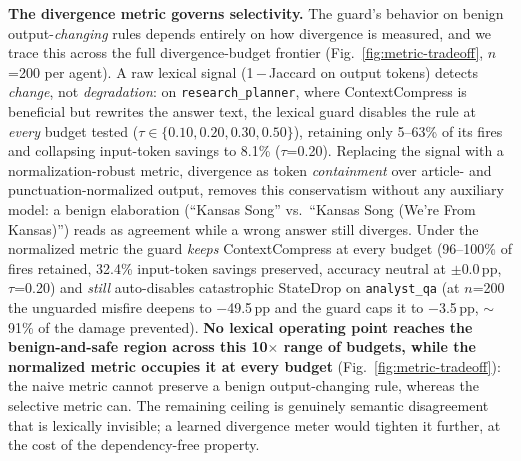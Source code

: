 \documentclass[sigconf,9pt]{acmart}
\begin{document}
\textbf{The divergence metric governs selectivity.} The guard's behavior on benign
output-\textit{changing} rules depends entirely on how divergence is measured, and we trace
this across the full divergence-budget frontier (Fig.~\ref{fig:metric-tradeoff}, $n$=200 per
agent). A raw lexical signal (1\,$-$\,Jaccard on output tokens) detects \textit{change}, not
\textit{degradation}: on \texttt{research\_planner}, where ContextCompress is beneficial but
rewrites the answer text, the lexical guard disables the rule at \textit{every} budget
tested ($\tau\in\{0.10,0.20,0.30,0.50\}$), retaining only 5--63\% of its fires and
collapsing input-token savings to 8.1\% ($\tau$=0.20). Replacing the signal with a
normalization-robust metric, divergence as token \textit{containment} over article- and
punctuation-normalized output, removes this conservatism without any auxiliary model: a
benign elaboration (``Kansas Song'' vs.\ ``Kansas Song (We're From Kansas)'') reads as
agreement while a wrong answer still diverges. Under the normalized metric the guard
\textit{keeps} ContextCompress at every budget (96--100\% of fires retained, 32.4\%
input-token savings preserved, accuracy neutral at $\pm$0.0\,pp, $\tau$=0.20) and
\textit{still} auto-disables catastrophic StateDrop on \texttt{analyst\_qa} (at $n$=200 the
unguarded misfire deepens to $-$49.5\,pp and the guard caps it to $-$3.5\,pp, $\sim$91\% of
the damage prevented). \textbf{No lexical operating point reaches the benign-and-safe region
across this 10$\times$ range of budgets, while the normalized metric occupies it at every
budget} (Fig.~\ref{fig:metric-tradeoff}): the naive metric cannot preserve a benign
output-changing rule, whereas the selective metric can. The remaining ceiling is genuinely
semantic disagreement that is lexically invisible; a learned divergence meter would tighten
it further, at the cost of the dependency-free property.
\end{document}

